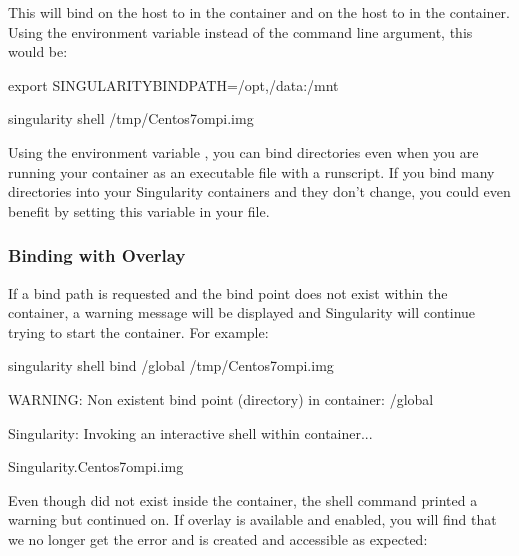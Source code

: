 \documentclass[letterpaper,10pt,english]{sphinxmanual}
\begin{document}
This will bind  on the host to  in the container and  on the host to  in the
container. Using the environment variable instead of the command line
argument, this would be:

%
\begin{sphinxVerbatim}[commandchars=\\\{\}]
\PYGZdl{} export SINGULARITY\PYGZus{}BINDPATH=\PYGZdq{}/opt,/data:/mnt\PYGZdq{}

\PYGZdl{} singularity shell /tmp/Centos7\PYGZhy{}ompi.img
\end{sphinxVerbatim}

Using the environment variable , you can bind directories even when you
are running your container as an executable file with a runscript. If
you bind many directories into your Singularity containers and they
don’t change, you could even benefit by setting this variable in your 
file.


\subsubsection{Binding with Overlay}
\label{\detokenize{bind_paths_and_mounts:binding-with-overlay}}
If a bind path is requested and the bind point does not exist within the
container, a warning message will be displayed and Singularity will
continue trying to start the container. For example:

%
\begin{sphinxVerbatim}[commandchars=\\\{\}]
\PYGZdl{} singularity shell \PYGZhy{}\PYGZhy{}bind /global /tmp/Centos7\PYGZhy{}ompi.img

WARNING: Non existent bind point (directory) in container: \PYGZsq{}/global\PYGZsq{}

Singularity: Invoking an interactive shell within container...


Singularity.Centos7\PYGZhy{}ompi.img\PYGZgt{}
\end{sphinxVerbatim}

Even though  did not exist inside the container, the shell command
printed a warning but continued on. If overlay is available and enabled,
you will find that we no longer get the error and  is created and
accessible as expected:
\end{document}
